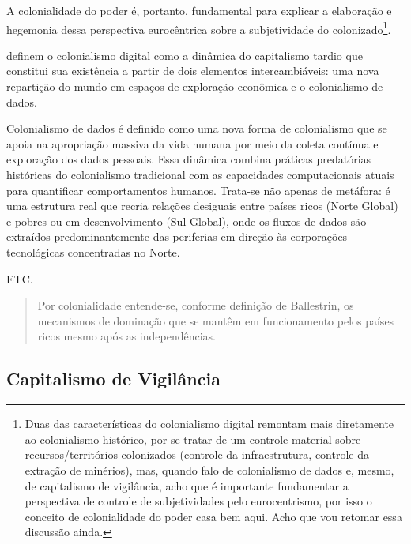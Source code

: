 A colonialidade do poder é, portanto, fundamental para explicar a elaboração e hegemonia dessa perspectiva eurocêntrica sobre a subjetividade do colonizado\footnote{
Duas das características do colonialismo digital remontam mais diretamente ao colonialismo histórico, por se tratar de um controle material sobre recursos/territórios colonizados (controle da infraestrutura, controle da extração de minérios), mas, quando falo de colonialismo de dados e, mesmo, de capitalismo de vigilância, acho que é importante fundamentar a perspectiva de controle de subjetividades pelo eurocentrismo, por isso o conceito de colonialidade do poder casa bem aqui. Acho que vou retomar essa discussão ainda.
}.


 definem o colonialismo digital como a dinâmica do capitalismo tardio que constitui sua existência a partir de dois elementos intercambiáveis: uma nova repartição do mundo em espaços de exploração econômica e o colonialismo de dados.

Colonialismo de dados é definido como uma nova forma de colonialismo que se apoia na apropriação massiva da vida humana por meio da coleta contínua e exploração dos dados pessoais. Essa dinâmica combina práticas predatórias históricas do colonialismo tradicional com as capacidades computacionais atuais para quantificar comportamentos humanos. Trata-se não apenas de metáfora: é uma estrutura real que recria relações desiguais entre países ricos (Norte Global) e pobres ou em desenvolvimento (Sul Global), onde os fluxos de dados são extraídos predominantemente das periferias em direção às corporações tecnológicas concentradas no Norte. \cite{Silveira2021}

ETC.

\begin{quote}
Por colonialidade entende-se, conforme definição de Ballestrin, os mecanismos de dominação que se mantêm em funcionamento pelos países ricos mesmo após as independências. \citeauthor{Silveira2021}
\end{quote}

\subsection{Capitalismo de Vigilância}
\label{subsec:capVig}

